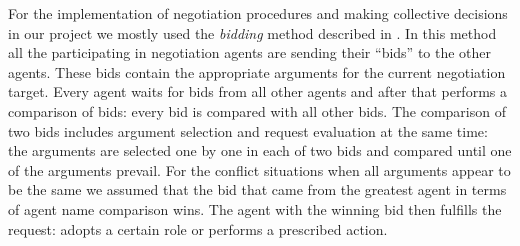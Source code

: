 For the implementation of negotiation procedures and making collective decisions in our project we mostly used the \emph{bidding} method described in  \cite{bordini_programming_2007}.
In this method all the participating in negotiation agents are sending their ``bids'' to the other agents.
These bids contain the appropriate arguments for the current negotiation target.
Every agent waits for bids from all other agents and after that performs a comparison of bids: every bid is compared with all other bids.
The comparison of two bids includes argument selection and request evaluation at the same time: the arguments are selected one by one in each of two bids and compared until one of the arguments prevail.
For the conflict situations when all arguments appear to be the same we assumed that the bid that came from the greatest agent in terms of agent name comparison wins.
The agent with the winning bid then fulfills the request: adopts a certain role or performs a prescribed action.

